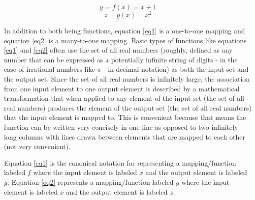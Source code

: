 \begin{equation} \label{eq1}
y = f(x) = x + 1
\end{equation}
\begin{equation} \label{eq2}
z = g(x) = x^{2}
\end{equation}

In addition to both being functions, equation \ref{eq1} is a one-to-one mapping and equation \ref{eq2} is a many-to-one mapping. Basic types of functions like equations \ref{eq1} and \ref{eq2} often use the set of all real numbers (roughly, defined as any number that can be expressed as a potentially infinite string of digits - in the case of irrational numbers like \begin{math}\pi\end{math} - in decimal notation) as both the input set and the output set. Since the set of all real numbers is infinitely large, the association from one input element to one output element is described by a mathematical transformation that when applied to any element of the input set (the set of all real numbers) produces the element of the output set (the set of all real numbers) that the input element is mapped to. This is convenient because that means the function can be written very concisely in one line as opposed to two infinitely long columns with lines drawn between elements that are mapped to each other (not very convenient). 

Equation \ref{eq1} is the canonical notation for representing a mapping/function labeled \begin{math}f\end{math} where the input element is labeled \begin{math}x\end{math} and the output element is labeled \begin{math}y\end{math}. Equation \ref{eq2} represents a mapping/function labeled \begin{math}g\end{math} where the input element is labeled \begin{math}x\end{math} and the output element is labeled \begin{math}z\end{math}. 

